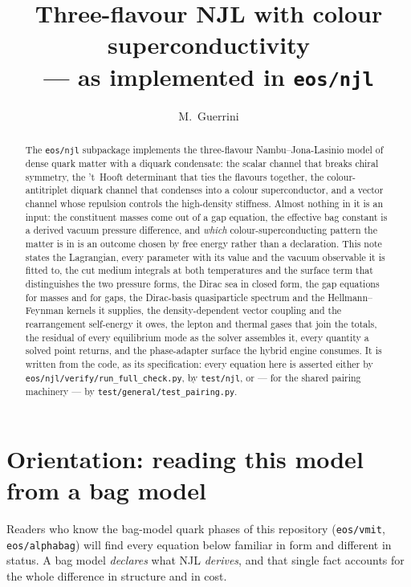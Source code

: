 \documentclass[aps,prc,onecolumn,superscriptaddress,nofootinbib,10pt]{revtex4-2}
\begin{document}
\title{Three-flavour NJL with colour superconductivity \\
       --- as implemented in \texttt{eos/njl}}

\author{M.~Guerrini}

\begin{abstract}
The \texttt{eos/njl} subpackage implements the three-flavour
Nambu--Jona-Lasinio model of dense quark matter with a diquark condensate: the
scalar channel that breaks chiral symmetry, the 't~Hooft determinant that ties
the flavours together, the colour-antitriplet diquark channel that condenses
into a colour superconductor, and a vector channel whose repulsion controls the
high-density stiffness. Almost nothing in it is an input: the constituent
masses come out of a gap equation, the effective bag constant is a derived
vacuum pressure difference, and \emph{which} colour-superconducting pattern the
matter is in is an outcome chosen by free energy rather than a declaration.
This note states the Lagrangian, every parameter with its value and the vacuum
observable it is fitted to, the cut medium integrals at both temperatures and
the surface term that distinguishes the two pressure forms, the Dirac sea in
closed form, the gap equations for masses and for gaps, the
Dirac-basis quasiparticle spectrum and the Hellmann--Feynman kernels it
supplies, the density-dependent vector coupling and the rearrangement
self-energy it owes, the lepton and thermal gases that join the totals, the
residual of every equilibrium mode as the solver assembles it, every quantity a
solved point returns, and the phase-adapter surface the hybrid engine
consumes. It is written from the code, as its specification:
every equation here is asserted either by
\texttt{eos/njl/verify/run\_full\_check.py}, by \texttt{test/njl}, or --- for
the shared pairing machinery --- by \texttt{test/general/test\_pairing.py}.
\end{abstract}

\maketitle

\section{Orientation: reading this model from a bag model}
\label{sec:orientation}

Readers who know the bag-model quark phases of this repository
(\texttt{eos/vmit}, \texttt{eos/alphabag}) will find every equation below
familiar in form and different in status. A bag model \emph{declares} what NJL
\emph{derives}, and that single fact accounts for the whole difference in
structure and in cost.
\end{document}

